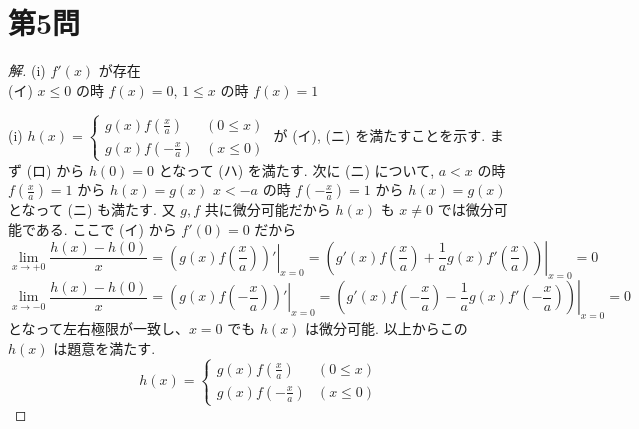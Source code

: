 \documentclass[../main.tex]{subfiles}
\begin{document}
\newpage

\section*{第5問}

\begin{proof}[解]
  (i) $f'(x)$ が存在\\
  (イ) $x \le 0$ の時 $f(x) = 0$, $1 \le x$ の時 $f(x) = 1$

  \begin{center}
    \qquad
  \end{center}

  (i) $h(x) =
  \begin{cases} g(x) f\left(\frac{x}{a}\right) & (0 \le x) \\ g(x) f\left(-\frac{x}{a}\right) & (x \le 0)
  \end{cases}$ が (イ), (ニ) を満たすことを示す. まず (ロ) から $h(0) = 0$ となって (ハ) を満たす. 次に (ニ) について,
  $a < x$ の時 $f\left(\frac{x}{a}\right) = 1$ から $h(x) = g(x)$
  $x < -a$ の時 $f\left(-\frac{x}{a}\right) = 1$ から $h(x) = g(x)$
  となって (ニ) も満たす. 又 $g, f$ 共に微分可能だから $h(x)$ も $x \ne 0$ では微分可能である. ここで (イ) から $f'(0) = 0$ だから
  \[
    \lim_{x \to +0} \frac{h(x) - h(0)}{x} = \left. \left( g(x) f\left(\frac{x}{a}\right) \right)' \right|_{x=0} = \left. \left( g'(x) f\left(\frac{x}{a}\right) + \frac{1}{a} g(x) f'\left(\frac{x}{a}\right) \right) \right|_{x=0} = 0
  \]
  \[
    \lim_{x \to -0} \frac{h(x) - h(0)}{x} = \left. \left( g(x) f\left(-\frac{x}{a}\right) \right)' \right|_{x=0} = \left. \left( g'(x) f\left(-\frac{x}{a}\right) - \frac{1}{a} g(x) f'\left(-\frac{x}{a}\right) \right) \right|_{x=0} = 0
  \]
  となって左右極限が一致し、$x=0$ でも $h(x)$ は微分可能. 以上からこの $h(x)$ は題意を満たす.
  \[
    h(x) =
    \begin{cases} g(x) f\left(\frac{x}{a}\right) & (0 \le x) \\ g(x) f\left(-\frac{x}{a}\right) & (x \le 0)
    \end{cases}
  \]


\end{proof}
\end{document}
